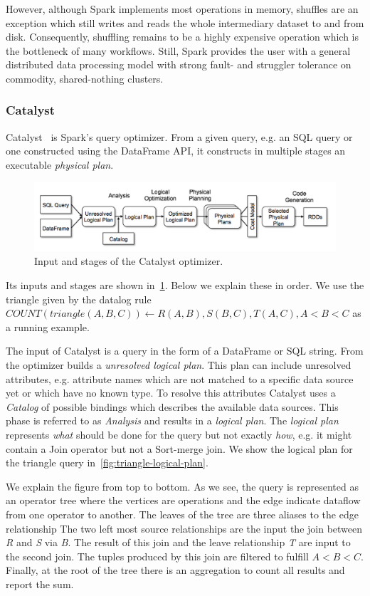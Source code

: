 However, although Spark implements most operations in memory, shuffles are an exception which still writes and reads
the whole intermediary dataset to and from disk.
Consequently, shuffling remains to be a highly expensive operation which is the bottleneck of many workflows.
Still, Spark provides the user with a general distributed data processing model with strong fault- and struggler tolerance
on commodity, shared-nothing clusters.

\subsubsection{Catalyst}
Catalyst~\cite{catalyst} is Spark's query optimizer.
From a given query, e.g. an SQL query or one constructed using the DataFrame API, it constructs
in multiple stages an executable \textit{physical plan}.
\begin{figure}
    \includegraphics{figures/catalyst-stages.png}
    \caption{Input and stages of the Catalyst optimizer.}
    \label{fig:catalyst-stages}
\end{figure}
Its inputs and stages are shown in~\cref{fig:catalyst-stages}.
Below we explain these in order.
We use the triangle given by the datalog rule $COUNT(triangle(A, B, C)) \leftarrow R(A, B), S(B, C), T(A, C), A < B < C $ as
a running example.

The input of Catalyst is a query in the form of a DataFrame or SQL string.
From the optimizer builds a \textit{unresolved logical plan}.
This plan can include unresolved attributes, e.g. attribute names which are not matched to a specific
data source yet or which have no known type.
To resolve this attributes Catalyst uses a \textit{Catalog} of possible bindings which describes the
available data sources.
This phase is referred to as \textit{Analysis} and results in a \textit{logical plan}.
The \textit{logical plan} represents \textit{what} should be done for the query but not exactly \textit{how},
e.g. it might contain a Join operator but not a Sort-merge join.
We show the logical plan for the triangle query in~\cref{fig:triangle-logical-plan}.

We explain the figure from top to bottom.
As we see, the query is represented as an operator tree where the vertices are operations and the edge indicate dataflow from
one operator to another.
The leaves of the tree are three aliases to the edge relationship
The two left most source relationships are the input the join between \textit{R} and \textit{S} via \textit{B}.
The result of this join and the leave relationship \textit{T} are input to the second join.
The tuples produced by this join are filtered to fulfill $A < B < C$.
Finally, at the root of the tree there is an aggregation to count all results and report the sum.

